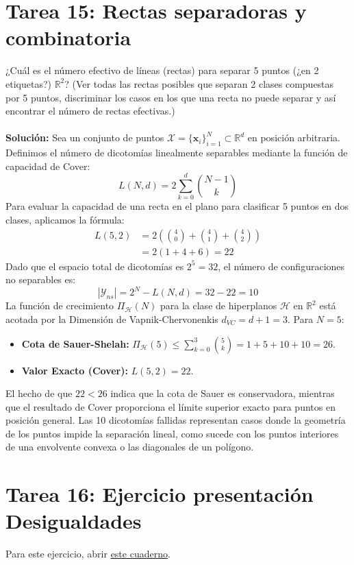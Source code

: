 \documentclass{article}
\begin{document}
\section{Tarea 15: Rectas separadoras y combinatoria}
\noindent ¿Cuál es el número efectivo de líneas (rectas) para separar 5 puntos (¿en 2 etiquetas?) $\mathbb{R}^2$? (Ver todas las rectas posibles que separan 2 clases compuestas por 5 puntos, discriminar los casos en los que una recta no puede separar y así encontrar el número de rectas efectivas.) \\ \\
\textbf{Solución:} Sea un conjunto de puntos $\mathcal{X} = \{\mathbf{x}_i\}_{i=1}^N \subset \mathbb{R}^d$ en posición arbitraria. Definimos el número de dicotomías linealmente separables mediante la función de capacidad de Cover:
\[
L(N, d) = 2 \sum_{k=0}^{d} \binom{N-1}{k}
\]
Para evaluar la capacidad de una recta en el plano para clasificar 5 puntos en dos clases, aplicamos la fórmula:
\begin{align*}
    L(5, 2) &= 2 \left( \binom{4}{0} + \binom{4}{1} + \binom{4}{2} \right) \\
    &= 2 (1 + 4 + 6) = 22
\end{align*}
Dado que el espacio total de dicotomías es $2^5 = 32$, el número de configuraciones no separables es:
\[
|\mathcal{Y}_{ns}| = 2^N - L(N, d) = 32 - 22 = 10
\]
La función de crecimiento $\Pi_{\mathcal{H}}(N)$ para la clase de hiperplanos $\mathcal{H}$ en $\mathbb{R}^2$ está acotada por la Dimensión de Vapnik-Chervonenkis $d_{VC} = d + 1 = 3$. Para $N=5$:
\begin{itemize}
    \item \textbf{Cota de Sauer-Shelah:} $\Pi_{\mathcal{H}}(5) \leq \sum_{k=0}^{3} \binom{5}{k} = 1 + 5 + 10 + 10 = 26$.
    \item \textbf{Valor Exacto (Cover):} $L(5, 2) = 22$.
\end{itemize}
El hecho de que $22 < 26$ indica que la cota de Sauer es conservadora, mientras que el resultado de Cover proporciona el límite superior exacto para puntos en posición general. Las 10 dicotomías fallidas representan casos donde la geometría de los puntos impide la separación lineal, como sucede con los puntos interiores de una envolvente convexa o las diagonales de un polígono.
\section{Tarea 16: Ejercicio presentación Desigualdades}
\noindent Para este ejercicio, abrir \href{https://colab.research.google.com/drive/1i3EZi1huZKmpNmWHTo7MsgXopWqNLMIN?usp=sharing}{este cuaderno}.
\end{document}
